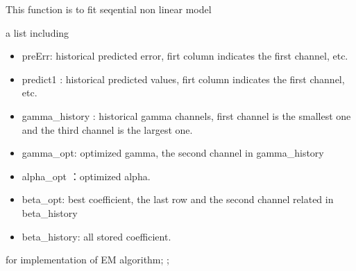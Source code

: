 \documentclass[a4paper]{book}
\begin{document}
%
\begin{Details}\relax
This function is to fit seqential non linear model
\end{Details}
%
\begin{Value}
a list including
\begin{itemize}

\item preErr: historical predicted error, firt column indicates the first channel, etc.
\item predict1 : historical predicted values, firt column indicates the first channel, etc.
\item gamma\_history : historical gamma channels, first channel is the smallest one and the third channel is the largest one.
\item gamma\_opt: optimized gamma, the second channel in gamma\_history
\item alpha\_opt ：optimized alpha.
\item beta\_opt: best coefficient, the last row and the second channel related in beta\_history
\item beta\_history: all stored coefficient.

\end{itemize}

\end{Value}
%
\begin{SeeAlso}\relax
{} for implementation of EM algorithm; ;
\end{SeeAlso}
%
\end{document}
